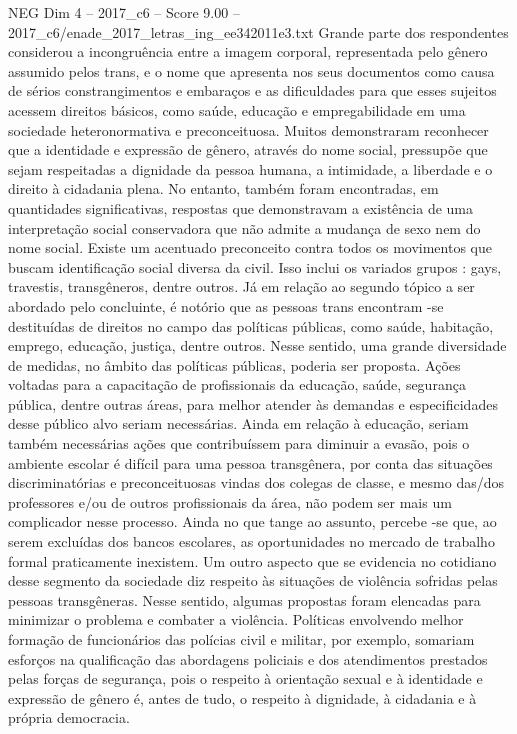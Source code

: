 \begin{textsample}{NEG Dim 4 – 2017\_c6 – Score 9.00 – 2017\_c6/enade\_2017\_letras\_ing\_ee342011e3.txt}
Grande parte dos respondentes considerou a incongruência entre a imagem corporal, representada pelo gênero assumido pelos trans, e o nome que apresenta nos seus documentos como causa de sérios constrangimentos e embaraços e as dificuldades para que esses sujeitos acessem direitos básicos, como saúde, educação e empregabilidade em uma sociedade heteronormativa e preconceituosa.
Muitos demonstraram reconhecer que a identidade e expressão de gênero, através do nome social, pressupõe que sejam respeitadas a dignidade da pessoa humana, a intimidade, a liberdade e o direito à cidadania plena.
No entanto, também foram encontradas, em quantidades significativas, respostas que demonstravam a existência de uma interpretação social conservadora que não admite a mudança de sexo nem do nome social.
Existe um acentuado preconceito contra todos os movimentos que buscam identificação social diversa da civil.
Isso inclui os variados grupos : gays, travestis, transgêneros, dentre outros.
Já em relação ao segundo tópico a ser abordado pelo concluinte, é notório que as pessoas trans encontram -se destituídas de direitos no campo das políticas públicas, como saúde, habitação, emprego, educação, justiça, dentre outros.
Nesse sentido, uma grande diversidade de medidas, no âmbito das políticas públicas, poderia ser proposta.
Ações voltadas para a capacitação de profissionais da educação, saúde, segurança pública, dentre outras áreas, para melhor atender às demandas e especificidades desse público alvo seriam necessárias.
Ainda em relação à educação, seriam também necessárias ações que contribuíssem para diminuir a evasão, pois o ambiente escolar é difícil para uma pessoa transgênera, por conta das situações discriminatórias e preconceituosas vindas dos colegas de classe, e mesmo das/dos professores e/ou de outros profissionais da área, não podem ser mais um complicador nesse processo.
Ainda no que tange ao assunto, percebe -se que, ao serem excluídas dos bancos escolares, as oportunidades no mercado de trabalho formal praticamente inexistem.
Um outro aspecto que se evidencia no cotidiano desse segmento da sociedade diz respeito às situações de violência sofridas pelas pessoas transgêneras.
Nesse sentido, algumas propostas foram elencadas para minimizar o problema e combater a violência.
Políticas envolvendo melhor formação de funcionários das polícias civil e militar, por exemplo, somariam esforços na qualificação das abordagens policiais e dos atendimentos prestados pelas forças de segurança, pois o respeito à orientação sexual e à identidade e expressão de gênero é, antes de tudo, o respeito à dignidade, à cidadania e à própria democracia.

\end{textsample}
